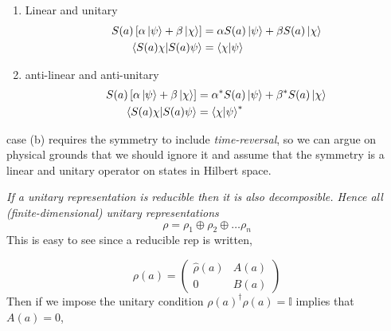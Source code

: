 \begin{enumerate}
\begin{enumerate}
    \item Linear and unitary \begin{equation}
    \begin{split}
        S(a)\left[\alpha\ket{\psi} + \beta \ket{\chi}\right] &= \alpha S(a)\ket{\psi} + \beta S(a)\ket{\chi} \\
    \braket{S(a)\chi|S(a)\psi}&=\braket{\chi|\psi}
    \end{split}
    \end{equation}
    \item anti-linear and anti-unitary \begin{equation}
    \begin{split}
        S(a)\left[\alpha\ket{\psi} + \beta \ket{\chi}\right] &= \alpha^* S(a)\ket{\psi} + \beta^* S(a)\ket{\chi} \\
    \braket{S(a)\chi|S(a)\psi}&=\braket{\chi|\psi}^*
    \end{split}
    \end{equation}
\end{enumerate}
case (b) requires the symmetry to include \textit{time-reversal}, so we can argue on physical grounds that we should ignore it and assume that the symmetry is a linear and unitary operator on states in Hilbert space.

\textit{If a unitary representation is reducible then it is also decomposible. Hence all (finite-dimensional) unitary representations}
\begin{equation}
    \rho = \rho_1\oplus\rho_2\oplus\dots\rho_n
\end{equation}
This is easy to see since a reducible rep is written, 

\begin{equation}
    \rho(a) = \begin{pmatrix}
        \hat{\rho}(a) & A(a)\\
        0 &B(a)
    \end{pmatrix}
\end{equation}
Then if we impose the unitary condition $\rho(a)^{\dagger}\rho(a) = \mathbb{I}$ implies that $A(a)=0$, 


\end{enumerate}
